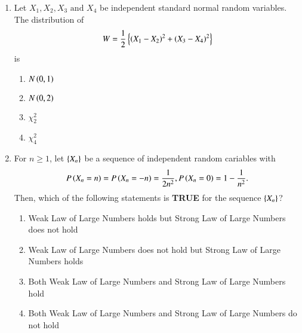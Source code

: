 \documentclass[journal,12pt,onecolumn]{IEEEtran}
\theoremstyle{remark}
\begin{document}
\begin{enumerate}
\item Let $X_1,X_2,X_3 \text{ and } X_4$ be independent standard normal random variables. The distribution of
\begin{align*}
W = \frac{1}{2}\left\{\left(X_1-X_2\right)^2 + \left(X_3-X_4\right)^2\right\}
\end{align*} is
\begin{enumerate}
\item $N\left(0,1\right)$
\item $N\left(0,2\right)$
\item $\chi_{2}^{2}$
\item $\chi_{4}^{2}$
\end{enumerate}

\item For $n\geq 1$, let $\left\{X_n\right\}$ be a sequence of independent random cariables with
\begin{align*}
	P\left(X_n = n\right) = P\left(X_n = -n\right) = \frac{1}{2n^2}, P\left(X_n = 0\right) = 1 - \frac{1}{n^2}.
\end{align*}
Then, which of the following statements is \textbf{TRUE} for the sequence $\left\{X_n\right\}$?
\begin{enumerate}
\item Weak Law of Large Numbers holds but Strong Law of Large Numbers does not hold
\item Weak Law of Large Numbers does not hold but Strong Law of Large Numbers holds
\item Both Weak Law of Large Numbers and Strong Law of Large Numbers hold
\item Both Weak Law of Large Numbers and Strong Law of Large Numbers do not hold
\end{enumerate}

\end{enumerate}
\end{document}
